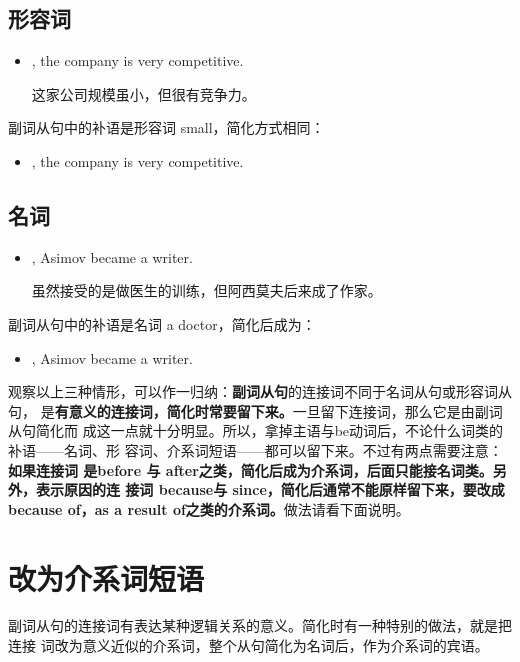 \subsection{形容词}

\begin{itemize}
\item {}, the company is very competitive.

  这家公司规模虽小，但很有竞争力。
\end{itemize}
副词从句中的补语是形容词 small，简化方式相同：
\begin{itemize}
\item {}, the company is very competitive.
\end{itemize}

\subsection{名词}

\begin{itemize}
\item {}, Asimov became a writer.

  虽然接受的是做医生的训练，但阿西莫夫后来成了作家。
\end{itemize}
副词从句中的补语是名词 a doctor，简化后成为：
\begin{itemize}
\item {}, Asimov became a writer.
\end{itemize}
观察以上三种情形，可以作一归纳：\textbf{副词从句}的连接词不同于名词从句或形容词从句，
是\textbf{有意义的连接词，简化时常要留下来。}一旦留下连接词，那么它是由副词从句简化而
成这一点就十分明显。所以，拿掉主语与be动词后，不论什么词类的补语——名词、形
容词、介系词短语——都可以留下来。不过有两点需要注意：\textbf{如果连接词
是before 与 after之类，简化后成为介系词，后面只能接名词类。另外，表示原因的连
接词 because与 since，简化后通常不能原样留下来，要改成 because of，as a
result of之类的介系词。}做法请看下面说明。

\section{改为介系词短语}

副词从句的连接词有表达某种逻辑关系的意义。简化时有一种特别的做法，就是把连接
词改为意义近似的介系词，整个从句简化为名词后，作为介系词的宾语。

